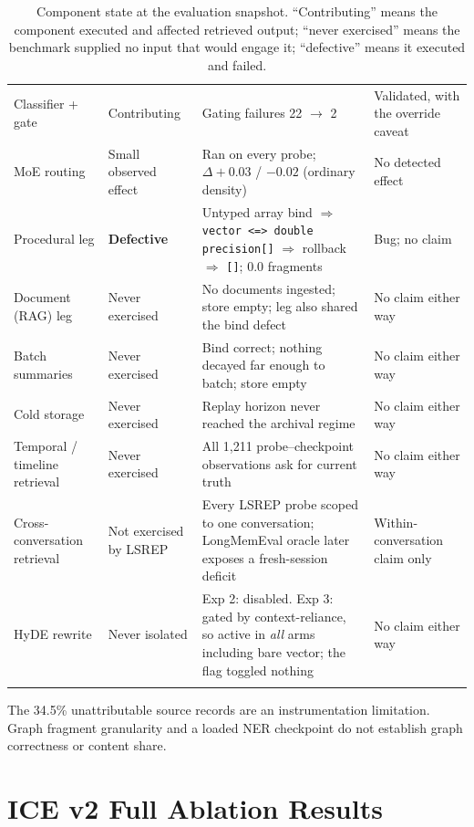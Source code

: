 \documentclass[twoside,11pt]{article}
\begin{document}
\begin{longtable}{@{}L{2.6cm}L{2.0cm}L{5.1cm}L{2.9cm}@{}}
Classifier + gate & Contributing & Gating failures 22 $\to$ 2 & Validated, with the override caveat \\
MoE routing & Small observed effect & Ran on every probe; $\Delta +0.03$ / $-0.02$ (ordinary density) & No detected effect \\
\midrule
Procedural leg & \textbf{Defective} & Untyped array bind $\Rightarrow$ \texttt{vector <=> double precision[]} $\Rightarrow$ rollback $\Rightarrow$ \texttt{[]}; 0.0 fragments & Bug; no claim \\
\midrule
Document (RAG) leg & Never exercised & No documents ingested; store empty; leg also shared the bind defect & No claim either way \\
Batch summaries & Never exercised & Bind correct; nothing decayed far enough to batch; store empty & No claim either way \\
Cold storage & Never exercised & Replay horizon never reached the archival regime & No claim either way \\
Temporal / timeline retrieval & Never exercised & All 1{,}211 probe--checkpoint observations ask for current truth & No claim either way \\
Cross-conversation retrieval & Not exercised by LSREP & Every LSREP probe scoped to one conversation; LongMemEval oracle later exposes a fresh-session deficit & Within-conversation claim only \\
HyDE rewrite & Never isolated & Exp 2: disabled. Exp 3: gated by context-reliance, so active in \emph{all} arms including bare vector; the flag toggled nothing & No claim either way \\
\bottomrule
\caption{Component state at the evaluation snapshot. ``Contributing'' means the component executed and affected retrieved output; ``never exercised'' means the benchmark supplied no input that would engage it; ``defective'' means it executed and failed.}
\label{tab:fidelity}\\
\end{longtable}

\endgroup

The 34.5\% unattributable source records are an instrumentation limitation. Graph fragment granularity and a loaded NER checkpoint do not establish graph correctness or content share.

\FloatBarrier
\section{ICE v2 Full Ablation Results}
\label{app:ablation}
\end{document}
